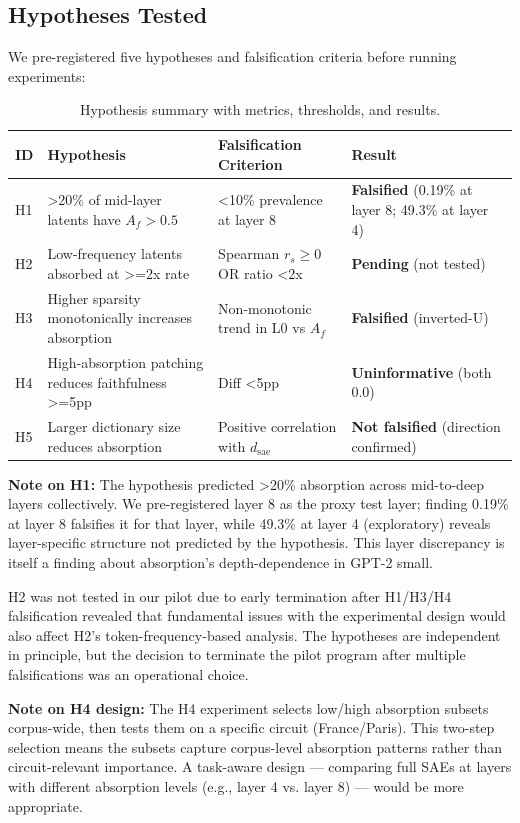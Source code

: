 \documentclass{article}
\begin{document}
\subsection{Hypotheses Tested}

We pre-registered five hypotheses and falsification criteria before running experiments:

\begin{table}[t]
\caption{Hypothesis summary with metrics, thresholds, and results.}
\label{tab:hypothesis_summary}
\centering
\begin{tabular}{llll}
\toprule
ID & Hypothesis & Falsification Criterion & Result \\
\midrule
H1 & >20\% of mid-layer latents have $A_f > 0.5$ & <10\% prevalence at layer 8 & \textbf{Falsified} (0.19\% at layer 8; 49.3\% at layer 4) \\
H2 & Low-frequency latents absorbed at >=2x rate & Spearman $r_s \geq 0$ OR ratio <2x & \textbf{Pending} (not tested) \\
H3 & Higher sparsity monotonically increases absorption & Non-monotonic trend in L0 vs $A_f$ & \textbf{Falsified} (inverted-U) \\
H4 & High-absorption patching reduces faithfulness >=5pp & Diff <5pp & \textbf{Uninformative} (both 0.0) \\
H5 & Larger dictionary size reduces absorption & Positive correlation with $d_{\text{sae}}$ & \textbf{Not falsified} (direction confirmed) \\
\bottomrule
\end{tabular}
\end{table}

\textbf{Note on H1:} The hypothesis predicted >20\% absorption across mid-to-deep layers collectively. We pre-registered layer 8 as the proxy test layer; finding 0.19\% at layer 8 falsifies it for that layer, while 49.3\% at layer 4 (exploratory) reveals layer-specific structure not predicted by the hypothesis. This layer discrepancy is itself a finding about absorption's depth-dependence in GPT-2 small.

H2 was not tested in our pilot due to early termination after H1/H3/H4 falsification revealed that fundamental issues with the experimental design would also affect H2's token-frequency-based analysis. The hypotheses are independent in principle, but the decision to terminate the pilot program after multiple falsifications was an operational choice.

\textbf{Note on H4 design:} The H4 experiment selects low/high absorption subsets corpus-wide, then tests them on a specific circuit (France/Paris). This two-step selection means the subsets capture corpus-level absorption patterns rather than circuit-relevant importance. A task-aware design --- comparing full SAEs at layers with different absorption levels (e.g., layer 4 vs. layer 8) --- would be more appropriate.
\end{document}

